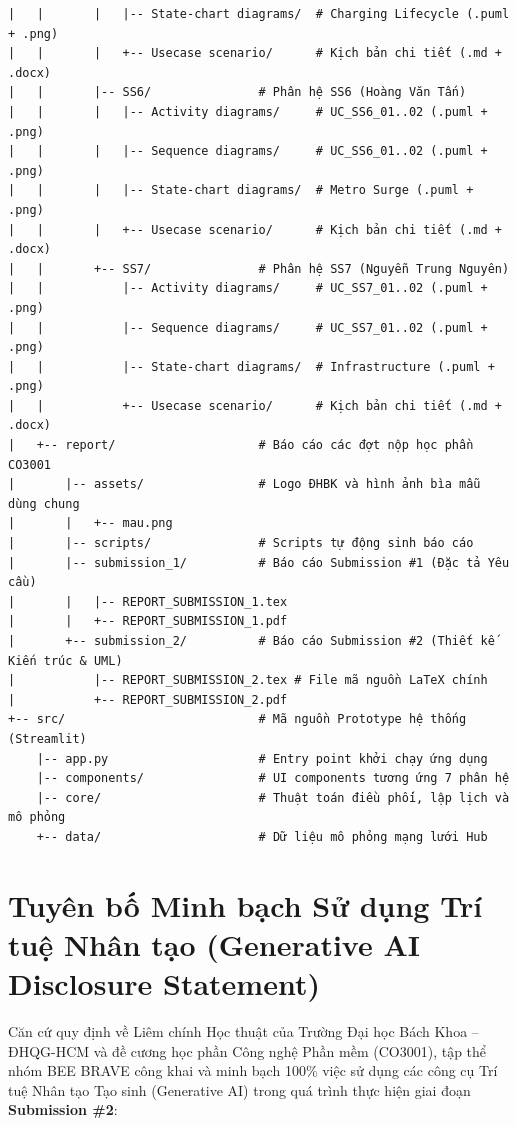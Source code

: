 \documentclass[12pt,a4paper]{article}
\begin{document}
{\begin{verbatim}
|   |       |   |-- State-chart diagrams/  # Charging Lifecycle (.puml + .png)
|   |       |   +-- Usecase scenario/      # Kịch bản chi tiết (.md + .docx)
|   |       |-- SS6/               # Phân hệ SS6 (Hoàng Văn Tấn)
|   |       |   |-- Activity diagrams/     # UC_SS6_01..02 (.puml + .png)
|   |       |   |-- Sequence diagrams/     # UC_SS6_01..02 (.puml + .png)
|   |       |   |-- State-chart diagrams/  # Metro Surge (.puml + .png)
|   |       |   +-- Usecase scenario/      # Kịch bản chi tiết (.md + .docx)
|   |       +-- SS7/               # Phân hệ SS7 (Nguyễn Trung Nguyên)
|   |           |-- Activity diagrams/     # UC_SS7_01..02 (.puml + .png)
|   |           |-- Sequence diagrams/     # UC_SS7_01..02 (.puml + .png)
|   |           |-- State-chart diagrams/  # Infrastructure (.puml + .png)
|   |           +-- Usecase scenario/      # Kịch bản chi tiết (.md + .docx)
|   +-- report/                    # Báo cáo các đợt nộp học phần CO3001
|       |-- assets/                # Logo ĐHBK và hình ảnh bìa mẫu dùng chung
|       |   +-- mau.png
|       |-- scripts/               # Scripts tự động sinh báo cáo
|       |-- submission_1/          # Báo cáo Submission #1 (Đặc tả Yêu cầu)
|       |   |-- REPORT_SUBMISSION_1.tex
|       |   +-- REPORT_SUBMISSION_1.pdf
|       +-- submission_2/          # Báo cáo Submission #2 (Thiết kế Kiến trúc & UML)
|           |-- REPORT_SUBMISSION_2.tex # File mã nguồn LaTeX chính
|           +-- REPORT_SUBMISSION_2.pdf
+-- src/                           # Mã nguồn Prototype hệ thống (Streamlit)
    |-- app.py                     # Entry point khởi chạy ứng dụng
    |-- components/                # UI components tương ứng 7 phân hệ
    |-- core/                      # Thuật toán điều phối, lập lịch và mô phỏng
    +-- data/                      # Dữ liệu mô phỏng mạng lưới Hub
\end{verbatim}
}

\section{Tuyên bố Minh bạch Sử dụng Trí tuệ Nhân tạo (Generative AI Disclosure Statement)}
\label{sec:ai-statement}

Căn cứ quy định về Liêm chính Học thuật của Trường Đại học Bách Khoa -- ĐHQG-HCM và đề cương học phần Công nghệ Phần mềm (CO3001), tập thể nhóm BEE BRAVE công khai và minh bạch 100\% việc sử dụng các công cụ Trí tuệ Nhân tạo Tạo sinh (Generative AI) trong quá trình thực hiện giai đoạn \textbf{Submission \#2}:
\end{document}
